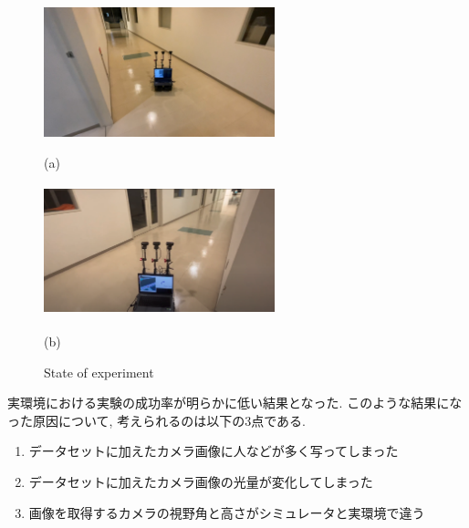 \begin{figure}[h]
  \centering
  \begin{minipage}[b]{67mm}
    \centering
    \includegraphics[width=67mm, height=38mm]{images/real_exp_learning.jpg}
    \caption*{(a) }
  \end{minipage} 
  \begin{minipage}[b]{67mm}
    \centering
    \includegraphics[width=67mm, height=38mm]{images/real_exp_test2.png}
    \caption*{(b) }
  \end{minipage}
  \caption{State of experiment}
  \label{Fig:state_environment}
\end{figure}

実環境における実験の成功率が明らかに低い結果となった. このような結果になった原因について, 考えられるのは以下の3点である.


\begin{enumerate}
  \item データセットに加えたカメラ画像に人などが多く写ってしまった
  \item データセットに加えたカメラ画像の光量が変化してしまった
  \item 画像を取得するカメラの視野角と高さがシミュレータと実環境で違う
\end{enumerate}

